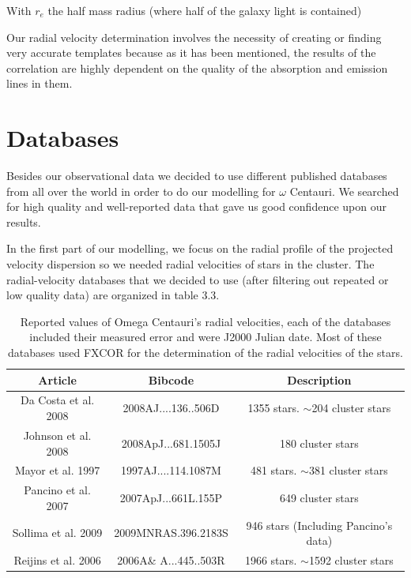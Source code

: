 With $r_{e}$ the half mass radius (where half of the galaxy light is contained)

Our radial velocity determination involves the necessity of creating or finding very accurate templates because as it has been mentioned, the results of the correlation are highly dependent on the quality of the absorption and emission lines in them.   


\section{Databases}

Besides our observational data we decided to use different published databases from all over the world in order to do our modelling for $\omega$ Centauri. We searched for high quality and well-reported data that gave us good confidence upon our results.
 
In the first part of our modelling, we focus on the radial profile of the projected velocity dispersion so we needed radial velocities of stars in the cluster. The radial-velocity databases that we decided to use (after filtering out repeated or low quality data) are organized in table 3.3.

\begin{table}[H]
\begin{center}
\begin{tabular}{| c | c| c| }
    \hline
    \textbf{Article} & \textbf{Bibcode} & \textbf{Description} \\ \hline
     Da Costa et al. 2008 & 2008AJ....136..506D & 1355 stars. $\sim$204 cluster stars \\ \hline
     Johnson et al. 2008 & 2008ApJ...681.1505J & 180 cluster stars \\ \hline
     Mayor et al. 1997 & 1997AJ....114.1087M & 481 stars. $\sim$381 cluster stars \\ \hline
     Pancino et al. 2007& 2007ApJ...661L.155P & 649 cluster stars \\ \hline
     Sollima et al. 2009& 2009MNRAS.396.2183S & 946 stars (Including Pancino's data) \\ \hline
     Reijins et al. 2006 & 2006A\& A...445..503R & 1966 stars. $\sim$1592 cluster stars \\ \hline
     
  \end{tabular} 
\caption[Database]{Reported values of Omega Centauri's radial velocities, each of the databases included their measured error and were J2000 Julian date. Most of these databases used FXCOR for the determination of the radial velocities of the stars.}
\end{center}
\end{table}
